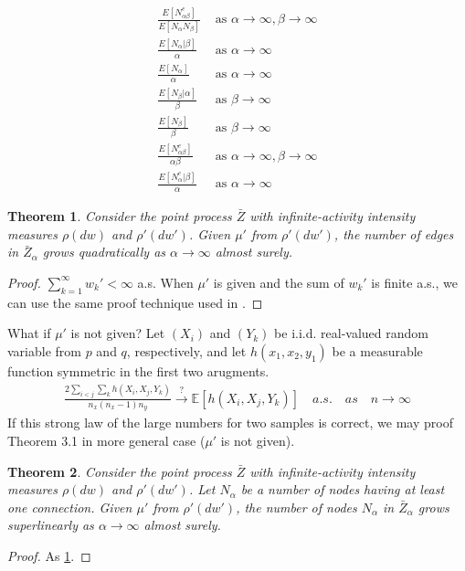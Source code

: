 \documentclass{article}
\newtheorem{theorem}{Theorem}[section]
\begin{document}
\begin{align}
\frac{E[N^e_{\alpha\beta}]}{E[N_\alpha N_\beta]} &\text{ as }\alpha \rightarrow \infty, \beta \rightarrow \infty \\
\frac{E[N_\alpha|\beta]}{\alpha} &\text{ as } \alpha \rightarrow \infty \\
\frac{E[N_\alpha]}{\alpha} &\text{ as } \alpha \rightarrow \infty \\
\frac{E[N_\beta|\alpha]}{\beta} &\text{ as } \beta \rightarrow \infty \\
\frac{E[N_\beta]}{\beta} &\text{ as } \beta \rightarrow \infty \\
\frac{E[N^e_{\alpha\beta}]}{\alpha\beta} &\text{ as }\alpha \rightarrow \infty, \beta \rightarrow \infty \\
\frac{E[N^e_{\alpha}|\beta]}{\alpha} &\text{ as }\alpha \rightarrow \infty
\end{align}


\begin{theorem} \label{thm:edge} Consider the point process $\bar{Z}$ with infinite-activity intensity measures $\rho(dw)$ and $\rho'(dw')$. Given $\mu'$ from $\rho'(dw')$, the number of edges in $\bar{Z}_{\alpha}$ grows quadratically as $\alpha \rightarrow \infty$ almost surely.
\end{theorem}
\begin{proof}
$\sum_{k=1}^{\infty} w_k' < \infty$ a.s. When $\mu'$ is given and the sum of $w_k'$ is finite a.s., we can use the same proof technique used in \cite{Caron2015}.
\end{proof}
What if $\mu'$ is not given? Let $(X_i)$ and $(Y_k)$ be i.i.d. real-valued random variable from $p$ and $q$, respectively, and let $h(x_1, x_2, y_1)$ be a measurable function symmetric in the first two arugments. 
\begin{align}
\frac{2 \sum_{i<j}\sum_{k} h(X_i, X_j, Y_k)}{n_x(n_x -1) n_y} \xrightarrow[]{?} \mathbb{E}[h(X_i, X_j, Y_k)]\quad a.s.\quad as \quad n\rightarrow \infty
\end{align}
If this strong law of the large numbers for two samples is correct, we may proof Theorem 3.1 in more general case ($\mu'$ is not given).

\begin{theorem} Consider the point process $\bar{Z}$ with infinite-activity intensity measures $\rho(dw)$ and $\rho'(dw')$. Let $N_\alpha$ be a number of nodes having at least one connection. Given $\mu'$ from $\rho'(dw')$, the number of nodes $N_\alpha$ in $\bar{Z}_{\alpha}$ grows superlinearly as $\alpha \rightarrow \infty$ almost surely.
\end{theorem}
\begin{proof}
As \ref{thm:edge}.
\end{proof}
\end{document}
